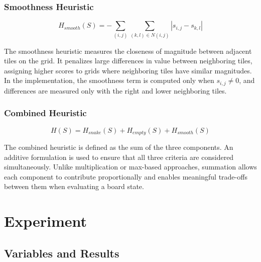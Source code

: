 \documentclass{article}
\begin{document}
\subsubsection{Smoothness Heuristic}

$$H_{smooth}(S) = -\sum_{(i,j)} \sum_{(k,l)\in N(i,j)} |s_{i,j} - s_{k,l}|$$

The smoothness heuristic measures the closeness of magnitude between adjacent tiles on the grid.
It penalizes large differences in value between neighboring tiles, assigning higher scores to grids where
neighboring tiles have similar magnitudes. In the implementation, the smoothness term is computed only when 
$s_{i, j} \neq 0$, and differences are measured only with the right and lower neighboring tiles.

\subsubsection{Combined Heuristic}

$$H(S) = H_{snake}(S) + H_{empty}(S) + H_{smooth}(S)$$

The combined heuristic is defined as the sum of the three components. An additive formulation is used to ensure
that all three criteria are considered simultaneously. Unlike multiplication or max-based approaches, summation
allows each component to contribute proportionally and enables meaningful trade-offs between them when evaluating
a board state.

\section{Experiment}

\subsection{Variables and Results}
\end{document}
